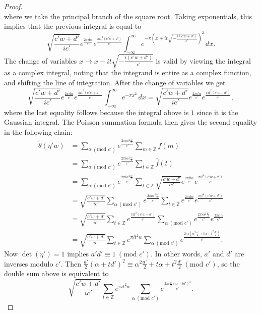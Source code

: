 \documentclass[12pt]{book}
\theoremstyle{definition}\newframedtheorem{method}{Method}
\newcommand{\tmod}[1]{\ \left(\text{mod }#1\right)}
\newcommand{\Z}{\mathbb{Z}}
\renewcommand{\a}{\alpha}
\renewcommand{\t}{\theta}
\newcommand{\<}{\langle}
\renewcommand{\>}{\rangle}
\newcommand{\wtilde}{\widetilde}
\begin{document}
\begin{proof}
\[      \]
      where we take the principal branch of the square root. Taking exponentials, this implies that the previous integral is equal to
      \[
        \sqrt{\frac{c'w+d'}{ic'}}e^{\frac{2\pi i t\a}{c'}}e^{\frac{\pi it^{2}(c'w+d')}{c'}}\int_{-\infty}^{\infty}e^{-\pi\left(x+it\sqrt{-\frac{i(c'w+d')}{c'}}\right)^{2}}\,dx.
      \]
      The change of variables $x \to x-it\sqrt{-\frac{i(c'w+d')}{c'}}$ is valid by viewing the integral as a complex integral, noting that the integrand is entire as a complex function, and shifting the line of integration. After the change of variables we get
      \[
        \sqrt{\frac{c'w+d'}{ic'}}e^{\frac{2\pi i t\a}{c'}}e^{\frac{\pi it^{2}(c'w+d')}{c'}}\int_{-\infty}^{\infty}e^{-\pi x^{2}}\,dx = \sqrt{\frac{c'w+d'}{ic'}}e^{\frac{2\pi i t\a}{c'}}e^{\frac{\pi it^{2}(c'w+d')}{c'}},
      \]
      where the last equality follows because the integral above is $1$ since it is the Gaussian integral. The Poisson summation formula then gives the second equality in the following chain:
      \begin{align*}
        \wtilde{\t}(\eta' w) &= \sum_{\a \tmod{c'}}e^{\frac{2\pi i\a^{2}\frac{a'}{2}}{c'}}\sum_{m \in \Z}f(m) \\
        &= \sum_{\a \tmod{c'}}e^{\frac{2\pi i\a^{2}\frac{a'}{2}}{c'}}\sum_{t \in \Z}\hat{f}(t) \\
        &= \sum_{\a \tmod{c'}}e^{\frac{2\pi i\a^{2}\frac{a'}{2}}{c'}}\sum_{t \in \Z}\sqrt{\frac{c'w+d'}{ic'}}e^{\frac{2\pi i t\a}{c'}}e^{\frac{\pi it^{2}(c'w+d')}{c'}} \\
        &= \sqrt{\frac{c'w+d'}{ic'}}\sum_{\a \tmod{c'}}e^{\frac{2\pi i\a^{2}\frac{a'}{2}}{c'}}\sum_{t \in \Z}e^{\frac{2\pi i t\a}{c'}}e^{\frac{\pi it^{2}(c'w+d')}{c'}} \\
        &= \sqrt{\frac{c'w+d'}{ic'}}\sum_{t \in \Z}e^{\frac{\pi it^{2}(c'w+d')}{c'}}\sum_{\a \tmod{c'}}e^{\frac{2\pi i\a^{2}\frac{a'}{2}}{c'}}e^{\frac{2\pi i t\a}{c'}} \\
        &= \sqrt{\frac{c'w+d'}{ic'}}\sum_{t \in \Z}e^{\pi it^{2}w}\sum_{\a \tmod{c'}}e^{\frac{2\pi i\left(\a^{2}\frac{a'}{2}+t\a+t^{2}\frac{d'}{2}\right)}{c'}}.
      \end{align*}
      Now $\det(\eta') = 1$ implies $a'd' \equiv 1 \tmod{c'}$. In other words, $a'$ and $d'$ are inverses modulo $c'$. Then $\frac{a'}{2}(\a+td')^{2} \equiv \a^{2}\frac{a'}{2}+t\a+t^{2}\frac{d'}{2} \tmod{c'}$, so the double sum above is equivalent to
      \[
        \sqrt{\frac{c'w+d'}{ic'}}\sum_{t \in \Z}e^{\pi it^{2}w}\sum_{\a \tmod{c'}}e^{\frac{2\pi i\frac{a'}{2}(\a+td')^{2}}{c'}}.
\]
\end{proof}
\end{document}
